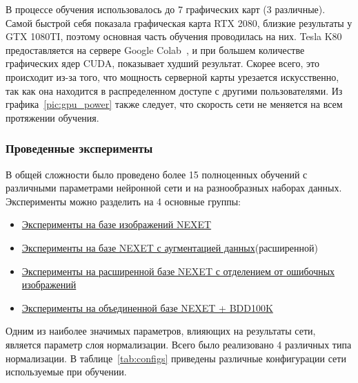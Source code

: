 \documentclass[11pt,a4paper]{extarticle}
\begin{document}
{		\noindent
		В процессе обучения использовалось до 7 графических карт (3 различные). 
		Самой быстрой себя показала графическая карта RTX 2080, близкие результаты у GTX 1080TI, поэтому основная часть обучения проводилась на них.
		Tesla K80 предоставляется на сервере Google Colab~\cite{colab}, и при большем количестве графических ядер CUDA, показывает худший результат.
		Скорее всего, это происходит из-за того, что мощность серверной карты урезается искусственно, так как она находится в распределенном доступе с другими пользователями.
		Из графика~\ref{pic:gpu_power} также следует, что скорость сети не меняется на всем протяжении обучения. 

		\subsubsection{Проведенные эксперименты}
			
			В общей сложности было проведено более 15 полноценных обучений с различными параметрами нейронной сети и на разнообразных наборах данных.
			Эксперименты можно разделить на 4 основные группы: 
			\begin{itemize}
				\item \hyperref[sec:tests:nexet]{Эксперименты на базе изображений NEXET}~\cite{data:nexet}
				\item \hyperref[sec:tests:nexet_ext]{Эксперименты на базе NEXET с аугментацией данных}\footnotemark[1] (расширенной)
				\item \hyperref[sec:tests:nexet_no_err]{Эксперименты на расширенной базе NEXET с отделением от ошибочных изображений}
				\item \hyperref[sec:tests:nexet_bdd]{Эксперименты на объединенной базе NEXET + BDD100K}~\cite{data:bdd100k}
			\end{itemize}

			\noindent
			Одним из наиболее значимых параметров, влияющих на результаты сети, является параметр слоя нормализации.
			Всего было реализовано 4 различных типа нормализации.
			В таблице~\ref{tab:configs} приведены различные конфигурации сети используемые при обучении.
			
}
\end{document}
